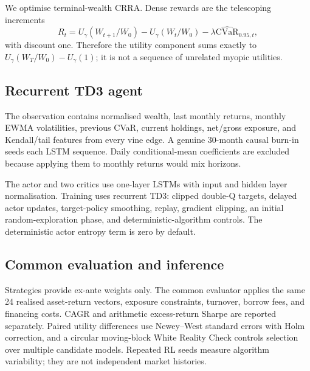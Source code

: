 We optimise terminal-wealth CRRA. Dense rewards are the telescoping increments
\[
 R_t=U_\gamma(W_{t+1}/W_0)-U_\gamma(W_t/W_0)
     -\lambda\widehat{\mathrm{CVaR}}_{0.95,t},
\]
with discount one. Therefore the utility component sums exactly to
\(U_\gamma(W_T/W_0)-U_\gamma(1)\); it is not a sequence of unrelated myopic
utilities.

\subsection{Recurrent TD3 agent}

The observation contains normalised wealth, last monthly returns, monthly
EWMA volatilities, previous CVaR, current holdings, net/gross exposure, and
Kendall/tail features from every vine edge. A genuine 30-month causal burn-in
seeds each LSTM sequence. Daily conditional-mean coefficients are excluded
because applying them to monthly returns would mix horizons.

The actor and two critics use one-layer LSTMs with input and hidden layer
normalisation. Training uses recurrent TD3: clipped double-Q targets, delayed
actor updates, target-policy smoothing, replay, gradient clipping, an initial
random-exploration phase, and deterministic-algorithm controls. The
deterministic actor entropy term is zero by default.

\subsection{Common evaluation and inference}

Strategies provide ex-ante weights only. The common evaluator applies the
same 24 realised asset-return vectors, exposure constraints, turnover,
borrow fees, and financing costs. CAGR and arithmetic excess-return Sharpe
are reported separately. Paired utility differences use Newey--West standard
errors with Holm correction, and a circular moving-block White Reality Check
controls selection over multiple candidate models. Repeated RL seeds measure
algorithm variability; they are not independent market histories.

